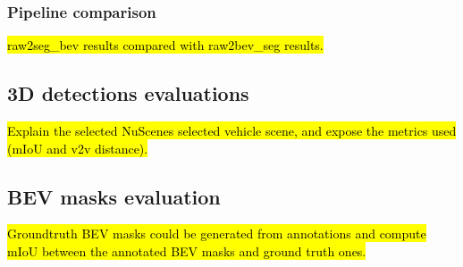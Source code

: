 \subsubsection{Pipeline comparison}
\hl{raw2seg\_bev results compared with raw2bev\_seg results.}

\subsection{3D detections evaluations}
\hl{Explain the selected NuScenes selected vehicle scene, and expose the metrics used (mIoU and v2v distance).}

\subsection{BEV masks evaluation}
\hl{Groundtruth BEV masks could be generated from annotations and compute mIoU between the annotated BEV masks and ground truth ones.}

